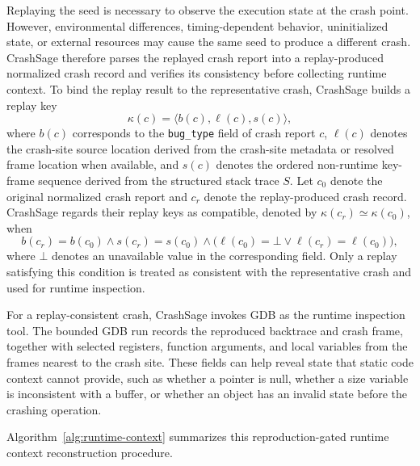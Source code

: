 \documentclass[pdflatex,sn-basic]{sn-jnl}%
\theoremstyle{thmstyleone}%
\theoremstyle{thmstyletwo}%
\theoremstyle{thmstylethree}%
\begin{document}
Replaying the seed is necessary to observe the execution state at the crash point.
However, environmental differences, timing-dependent behavior, uninitialized state, or external resources may cause the same seed to produce a different crash.
CrashSage therefore parses the replayed crash report into a replay-produced normalized crash record and verifies its consistency before collecting runtime context.
To bind the replay result to the representative crash, CrashSage builds a replay key
\begin{equation}
\kappa(c)=\langle b(c), \ell(c), s(c) \rangle ,
\end{equation}
where \(b(c)\) corresponds to the \texttt{bug\_type} field of crash report \(c\), \(\ell(c)\) denotes the crash-site source location derived from the crash-site metadata or resolved frame location when available, and \(s(c)\) denotes the ordered non-runtime key-frame sequence derived from the structured stack trace \(S\).
Let \(c_0\) denote the original normalized crash report and \(c_r\) denote the replay-produced crash record.
CrashSage regards their replay keys as compatible, denoted by \(\kappa(c_r)\simeq\kappa(c_0)\), when
\begin{equation}
b(c_r)=b(c_0) \land s(c_r)=s(c_0) \land
\bigl(\ell(c_0)=\bot \lor \ell(c_r)=\ell(c_0)\bigr),
\end{equation}
where \(\bot\) denotes an unavailable value in the corresponding field.
Only a replay satisfying this condition is treated as consistent with the representative crash and used for runtime inspection.

For a replay-consistent crash, CrashSage invokes GDB as the runtime inspection tool.
The bounded GDB run records the reproduced backtrace and crash frame, together with selected registers, function arguments, and local variables from the frames nearest to the crash site.
These fields can help reveal state that static code context cannot provide, such as whether a pointer is null, whether a size variable is inconsistent with a buffer, or whether an object has an invalid state before the crashing operation.

Algorithm~\ref{alg:runtime-context} summarizes this reproduction-gated runtime context reconstruction procedure.
\end{document}
